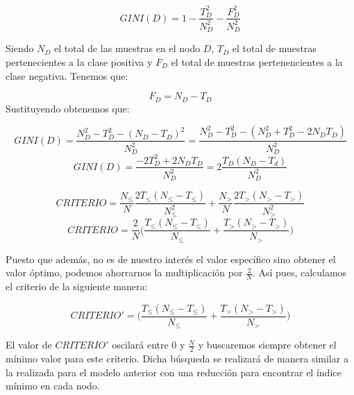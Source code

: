 $$GINI(D) = 1 - \frac{T_D^2}{N_D^2} - \frac{F_D^2}{N_D^2}$$

Siendo $N_D$ el total de las muestras en el nodo $D$, $T_D$ el total de muestras pertenecientes a la clase positiva y $F_D$ el total de muestras pertenencientes a la clase negativa. Tenemos que:

$$F_D = N_D - T_D$$
Sustituyendo obtenemos que:

$$GINI(D) = \frac{N_D^2-T_D^2- (N_D - T_D)^2}{N_D^2} = \frac{N_D^2 - T_D^2 - (N_D^2+T_D^2 - 2 N_D T_D)}{N_D^2}$$
$$GINI(D) = \frac{-2T_D^2 + 2N_DT_D}{N_D^2} = 2 \frac{T_D(N_D-T_d)}{N_D^2}$$

$$CRITERIO = \frac{N_\leq}{N}\frac{2T_\leq(N_\leq - T_\leq)}{N_\leq^2} + \frac{N_>}{N}\frac{2T_>(N_> - T_>)}{N_>^2}$$
$$CRITERIO = \frac{2}{N}\Big(\frac{T_\leq(N_\leq - T_\leq)}{N_{\leq}} + \frac{T_>(N_> - T_>)}{N_>}\Big)$$

Puesto que además, no es de nuestro interés el valor específico sino obtener el valor óptimo, podemos ahorrarnos la multiplicación por $\frac{2}{N}$. Así pues, calculamos el criterio de la siguiente manera:

$$CRITERIO' = \Big(\frac{T_\leq(N_\leq - T_\leq)}{N_{\leq}} + \frac{T_>(N_> - T_>)}{N_>}\Big)$$

El valor de $CRITERIO'$ oscilará entre 0 y $\frac{N}{2}$ y buscaremos siempre obtener el mínimo valor para este criterio. Dicha búsqueda se realizará de manera similar a la realizada para el modelo anterior con una reducción para encontrar el índice mínimo en cada nodo.

